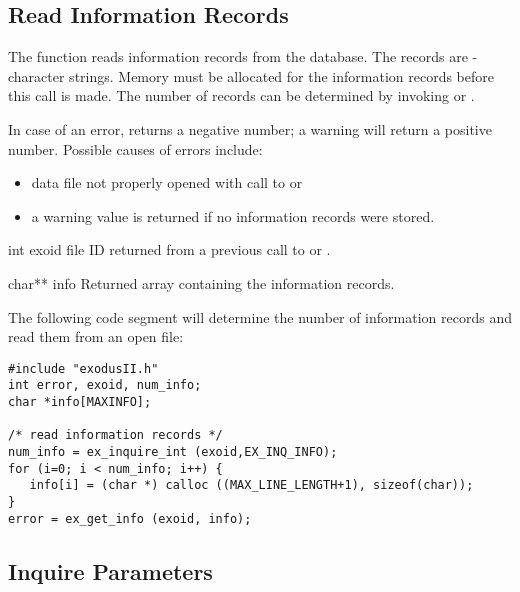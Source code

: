 \subsection{Read Information Records}

The function  reads information records from the
database. The records are -character
strings. Memory must be allocated for the information records before
this call is made. The number of records can be determined by invoking
 or .


In case of an error,  returns a negative number;
a warning will return a positive number. Possible causes of errors
include:


\begin{itemize}
 \item data file not properly opened with call to  or

 \item a warning value is returned if no information records were
 stored.
\end{itemize}





\begin{parameters}
\item[{int exoid \R{}}]
\exo{} file ID returned from a previous call to  
or .

\item[char** info \W{}]
Returned array containing the information records.
\end{parameters}

The following code segment will determine the number of information 
records and read them from an open \exo{} file:


\begin{lstlisting}
#include "exodusII.h"
int error, exoid, num_info;
char *info[MAXINFO];

/* read information records */
num_info = ex_inquire_int (exoid,EX_INQ_INFO);
for (i=0; i < num_info; i++) {
   info[i] = (char *) calloc ((MAX_LINE_LENGTH+1), sizeof(char));
}
error = ex_get_info (exoid, info);
\end{lstlisting}



\subsection{Inquire \exo{} Parameters}\label{s:inquire}


